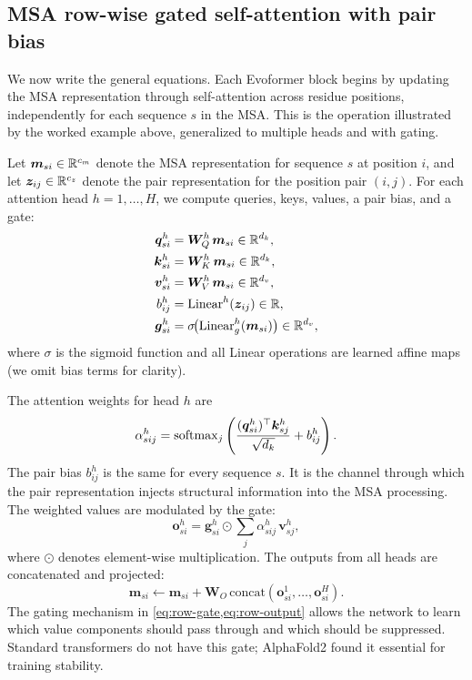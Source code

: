 \subsection*{MSA row-wise gated self-attention with pair bias}
\label{sec:af2-row-attn}

We now write the general equations.
Each Evoformer block begins by updating the MSA representation through self-attention across residue positions, independently for each sequence $s$ in the MSA.
This is the operation illustrated by the worked example above, generalized to multiple heads and with gating.

Let $\bm{m}_{si} \in \mathbb{R}^{c_m}$ denote the MSA representation for sequence $s$ at position $i$, and let $\bm{z}_{ij} \in \mathbb{R}^{c_z}$ denote the pair representation for the position pair $(i, j)$.
For each attention head $h = 1, \ldots, H$, we compute queries, keys, values, a pair bias, and a gate:
\begin{align}
\bm{q}_{si}^h &= \bm{W}_Q^h\, \bm{m}_{si} \in \mathbb{R}^{d_k}, \label{eq:row-q} \\
\bm{k}_{si}^h &= \bm{W}_K^h\, \bm{m}_{si} \in \mathbb{R}^{d_k}, \label{eq:row-k} \\
\bm{v}_{si}^h &= \bm{W}_V^h\, \bm{m}_{si} \in \mathbb{R}^{d_v}, \label{eq:row-v} \\
b_{ij}^h &= \text{Linear}^h(\bm{z}_{ij}) \in \mathbb{R}, \label{eq:row-bias} \\
\bm{g}_{si}^h &= \sigma\!\bigl(\text{Linear}_g^h(\bm{m}_{si})\bigr) \in \mathbb{R}^{d_v}, \label{eq:row-gate}
\end{align}
where $\sigma$ is the sigmoid function and all Linear operations are learned affine maps (we omit bias terms for clarity).

The attention weights for head $h$ are
\begin{equation}
\label{eq:row-attn-weights}
\alpha_{sij}^h = \operatorname{softmax}_j \left( \frac{(\bm{q}_{si}^h)^\top \bm{k}_{sj}^h}{\sqrt{d_k}} + b_{ij}^h \right).
\end{equation}
The pair bias $b_{ij}^h$ is the same for every sequence $s$.
It is the channel through which the pair representation injects structural information into the MSA processing.
The weighted values are modulated by the gate:
\begin{equation}
\label{eq:row-output}
\bm{o}_{si}^h = \bm{g}_{si}^h \odot \sum_j \alpha_{sij}^h\, \bm{v}_{sj}^h,
\end{equation}
where $\odot$ denotes element-wise multiplication.
The outputs from all heads are concatenated and projected:
\begin{equation}
\label{eq:row-final}
\bm{m}_{si} \leftarrow \bm{m}_{si} + \bm{W}_O \,\text{concat}(\bm{o}_{si}^1, \ldots, \bm{o}_{si}^H).
\end{equation}
The gating mechanism in \cref{eq:row-gate,eq:row-output} allows the network to learn which value components should pass through and which should be suppressed.
Standard transformers do not have this gate; AlphaFold2 found it essential for training stability.

